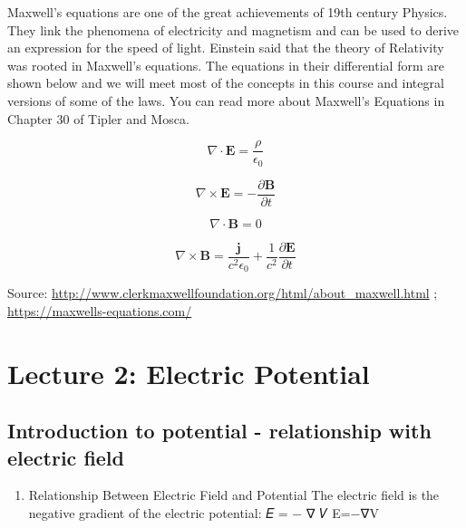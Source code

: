 \documentclass[
  letterpaper,
  DIV=11,
  numbers=noendperiod]{scrreprt}
\providecommand{\tightlist}{%
  \setlength{\itemsep}{0pt}\setlength{\parskip}{0pt}}\usepackage{longtable,booktabs,array}
\begin{document}
Maxwell's equations are one of the great achievements of 19th century
Physics. They link the phenomena of electricity and magnetism and can be
used to derive an expression for the speed of light. Einstein said that
the theory of Relativity was rooted in Maxwell's equations. The
equations in their differential form are shown below and we will meet
most of the concepts in this course and integral versions of some of the
laws. You can read more about Maxwell's Equations in Chapter 30 of
Tipler and Mosca.

\begin{equation}

\nabla \cdot \mathbf{E} = \frac{\rho}{\epsilon_0}
\end{equation}

\begin{equation}
\nabla \times \mathbf{E} = - \frac{\partial \mathbf{B}}{\partial t} 
\end{equation}

\begin{equation}
\nabla \cdot \mathbf{B} = 0
\end{equation}

\begin{equation}
\nabla \times \mathbf{B} = \frac{\mathbf{j}}{c^2 \epsilon_0} + \frac{1}{c^2} \frac{\partial \mathbf{E}}{\partial t}
\end{equation}

Source:
\url{http://www.clerkmaxwellfoundation.org/html/about_maxwell.html} ;
\url{https://maxwells-equations.com/}


\chapter{Lecture 2: Electric
Potential}\label{lecture-2-electric-potential}

\section{Introduction to potential - relationship with electric
field}\label{introduction-to-potential---relationship-with-electric-field}

\begin{enumerate}
\def\labelenumi{\arabic{enumi}.}
\setcounter{enumi}{9}
\tightlist
\item
  Relationship Between Electric Field and Potential The electric field
  is the negative gradient of the electric potential: 𝐸 = − ∇ 𝑉 E=−∇V
\end{enumerate}
\end{document}
